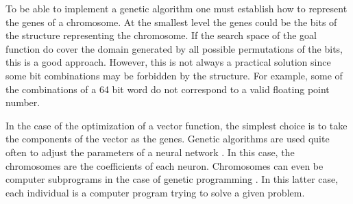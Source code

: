  To be able to
implement a genetic algorithm one must establish how to represent
the genes of a chromosome. At the smallest level the genes could
be the bits of the structure representing the chromosome. If the
search space of the goal function do cover the domain generated by
all possible permutations of the bits, this is a good approach.
However, this is not always a practical solution since some bit
combinations may be forbidden by the structure. For example, some
of the combinations of a 64 bit word do not correspond to a valid
floating point number.

In the case of the optimization of a vector function, the simplest
choice is to take the components of the vector as the genes.
Genetic algorithms are used quite often to adjust the parameters
of a neural network \cite{BerLin}. In this case, the chromosomes
are the coefficients of each neuron. Chromosomes can even be
computer subprograms in the case of genetic programming
\cite{Koza}. In this latter case, each individual is a computer
program trying to solve a given problem.

